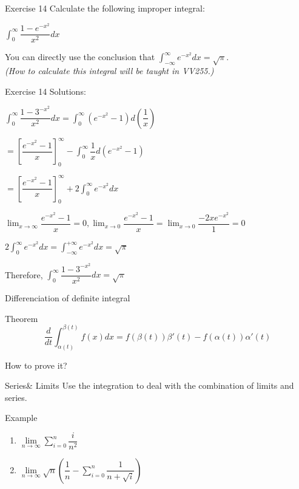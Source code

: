 \documentclass{beamer}
\begin{document}
\begin{frame}{Exercise 14}
Calculate the following improper integral:\\
\begin{center}
$\int_{0}^{\infty} \dfrac{1-e^{-x^{2}}}{x^{2}}dx$
\end{center} 
\bigskip
You can directly use the conclusion that $\int_{-\infty}^{\infty}e^{-x^{2}}dx=\sqrt{\pi}$.\\
\textit{(How to calculate this integral will be taught in VV255.)}
\end{frame}

\begin{frame}{Exercise 14}
Solutions:

$\int_0^{\infty}\dfrac{1-3^{-x^2}}{x^2}dx = \int_0^{\infty}(e^{-x^2}-1)d(\dfrac{1}{x})$

$= \left[\dfrac{e^{-x^2} - 1}{x}\right]_0^{\infty} - \int_{0}^{\infty}\dfrac{1}{x}d(e^{-x^2}-1)$

$= \left[\dfrac{e^{-x^2} - 1}{x}\right]_0^{\infty} + 2\int_0^{\infty}e^{-x^2}dx$

$\lim_{x\rightarrow\infty}\dfrac{e^{-x^2}-1}{x} = 0, \lim_{x\rightarrow0} \dfrac{e^{-x^2}-1}{x} = \lim_{x\rightarrow0} \dfrac{-2xe^{-x^2}}{1} = 0$

$2\int_0^{\infty}e^{-x^2}dx = \int_{-\infty}^{+\infty}e^{-x^2}dx = \sqrt{\pi}$

Therefore, $\int_0^{\infty}\dfrac{1-3^{-x^2}}{x^2}dx = \sqrt{\pi}$
    
\end{frame}
\begin{frame}{Differenciation of definite integral}
    \begin{block}{Theorem}
       $$ \dfrac{d}{dt}\int_{\alpha(t)}^{\beta(t)}f(x)dx=f(\beta(t))\beta'(t)-f(\alpha(t))\alpha'(t)$$
    \end{block}
    How to prove it?
\end{frame}
\begin{frame}{Series\& Limits}
    Use the integration to deal with the combination of limits and series.
    \begin{block}{Example}
    \begin{enumerate}
        \item $\lim\limits_{n\to\infty}\sum\limits_{i=0}^{n}\dfrac{i}{n^2} $
        \item $\lim\limits_{n\to\infty}\sqrt{n}(\dfrac{1}{n}-\sum\limits_{i=0}^{n}\dfrac{1}{n+\sqrt{i}})$
        
    \end{enumerate}
    \end{block}
\end{frame}
\end{document}
